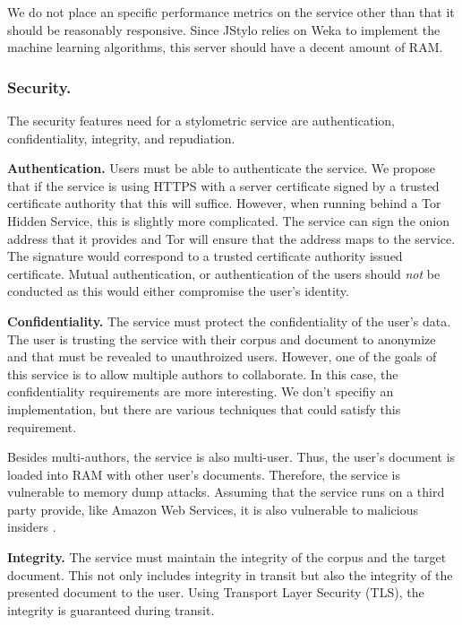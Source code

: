 \documentclass[letterpaper]{article}
\begin{document}
We do not place an specific performance metrics on the service other
than that it should be reasonably responsive.  Since JStylo relies on
Weka \cite{Hall:2009:WDM:1656274.1656278} to implement the machine
learning algorithms, this server should have a decent amount of RAM.

\subsubsection{Security.}

The security features need for a stylometric service are
authentication, confidentiality, integrity, and repudiation.

{\bf Authentication.}  Users must be able to authenticate the
service.  We propose that if the service is using HTTPS with a server
certificate signed by a trusted certificate authority that this will
suffice.  However, when running behind a Tor Hidden Service, this is
slightly more complicated.  The service can sign the onion address
that it provides and Tor will ensure that the address maps to the
service.  The signature would correspond to a trusted certificate
authority issued certificate.  Mutual authentication, or
authentication of the users should \emph{not} be conducted as this
would either compromise the user's identity.

{\bf Confidentiality.} The service must protect the confidentiality of
the user's data.  The user is trusting the service with their corpus
and document to anonymize and that must be revealed to unauthroized
users.  However, one of the goals of this service is to allow multiple
authors to collaborate.  In this case, the confidentiality
requirements are more interesting.  We don't specifiy an
implementation, but there are various techniques that could satisfy
this requirement.

Besides multi-authors, the service is also multi-user.  Thus, the
user's document is loaded into RAM with other user's documents.
Therefore, the service is vulnerable to memory dump attacks.  Assuming
that the service runs on a third party provide, like Amazon Web
Services, it is also vulnerable to malicious insiders
\cite{conf/dsn/RochaC11}.

{\bf Integrity.}  The service must maintain the integrity of the
corpus and the target document.  This not only includes integrity in
transit but also the integrity of the presented document to the user.
Using Transport Layer Security (TLS), the integrity is guaranteed
during transit.
\end{document}
